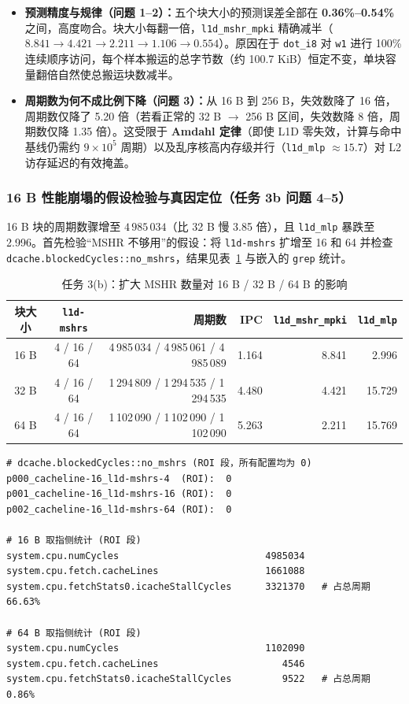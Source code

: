 \documentclass[12pt,a4paper,fontset=mac]{ctexart}
\begin{document}
\begin{itemize}
  \item \textbf{预测精度与规律（问题 1--2）：}五个块大小的预测误差全部在 \textbf{0.36\%--0.54\%} 之间，高度吻合。块大小每翻一倍，\texttt{l1d\_mshr\_mpki} 精确减半（$8.841 \to 4.421 \to 2.211 \to 1.106 \to 0.554$）。原因在于 \texttt{dot\_i8} 对 \texttt{w1} 进行 100\% 连续顺序访问，每个样本搬运的总字节数（约 100.7 KiB）恒定不变，单块容量翻倍自然使总搬运块数减半。
  \item \textbf{周期数为何不成比例下降（问题 3）：}从 16 B 到 256 B，失效数降了 16 倍，周期数仅降了 5.20 倍（若看正常的 32 B $\to$ 256 B 区间，失效数降 8 倍，周期数仅降 1.35 倍）。这受限于 \textbf{Amdahl 定律}（即使 L1D 零失效，计算与命中基线仍需约 $9\times10^5$ 周期）以及乱序核高内存级并行（\texttt{l1d\_mlp} $\approx 15.7$）对 L2 访存延迟的有效掩盖。
\end{itemize}

\subsubsection{16 B 性能崩塌的假设检验与真因定位（任务 3b 问题 4--5）}
16 B 块的周期数骤增至 $4\,985\,034$（比 32 B 慢 3.85 倍），且 \texttt{l1d\_mlp} 暴跌至 2.996。首先检验“MSHR 不够用”的假设：将 \texttt{l1d-mshrs} 扩增至 16 和 64 并检查 \texttt{dcache.blockedCycles::no\_mshrs}，结果见表~\ref{tab:task3mshr} 与嵌入的 \texttt{grep} 统计。

\begin{table}[H]\centering\small
\caption{任务 3(b)：扩大 MSHR 数量对 16 B / 32 B / 64 B 的影响}\label{tab:task3mshr}
\begin{tabular}{ccrrrr}\toprule
块大小 & \texttt{l1d-mshrs} & 周期数 & IPC & \texttt{l1d\_mshr\_mpki} & \texttt{l1d\_mlp} \\\midrule
16 B & 4 / 16 / 64 & 4\,985\,034 / 4\,985\,061 / 4\,985\,089 & 1.164 & 8.841 & 2.996 \\
32 B & 4 / 16 / 64 & 1\,294\,809 / 1\,294\,535 / 1\,294\,535 & 4.480 & 4.421 & 15.729 \\
64 B & 4 / 16 / 64 & 1\,102\,090 / 1\,102\,090 / 1\,102\,090 & 5.263 & 2.211 & 15.769 \\
\bottomrule\end{tabular}
\end{table}

\begin{lstlisting}[language={},caption={16 B 与 64 B 在 ROI 段（第 2 次 dump）的阻塞与取指统计}]
# dcache.blockedCycles::no_mshrs (ROI 段，所有配置均为 0)
p000_cacheline-16_l1d-mshrs-4  (ROI):  0
p001_cacheline-16_l1d-mshrs-16 (ROI):  0
p002_cacheline-16_l1d-mshrs-64 (ROI):  0

# 16 B 取指侧统计 (ROI 段)
system.cpu.numCycles                          4985034
system.cpu.fetch.cacheLines                   1661088
system.cpu.fetchStats0.icacheStallCycles      3321370   # 占总周期 66.63%

# 64 B 取指侧统计 (ROI 段)
system.cpu.numCycles                          1102090
system.cpu.fetch.cacheLines                      4546
system.cpu.fetchStats0.icacheStallCycles         9522   # 占总周期 0.86%
\end{lstlisting}
\end{document}
